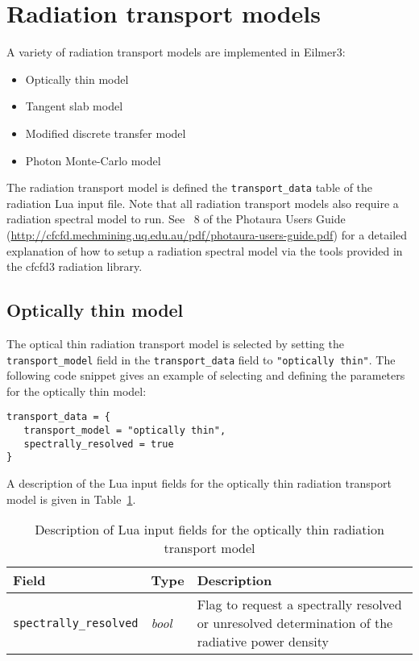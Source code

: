 \section{Radiation transport models}
\label{app:rt-models}

A variety of radiation transport models are implemented in Eilmer3:

\begin{itemize}
 \item Optically thin model
 \item Tangent slab model 
 \item Modified discrete transfer model
 \item Photon Monte-Carlo model
\end{itemize}

The radiation transport model is defined the \texttt{transport\_data} table of the radiation Lua input file.
Note that all radiation transport models also require a radiation spectral model to run.
See \textsection~8 of the Photaura Users Guide (\url{http://cfcfd.mechmining.uq.edu.au/pdf/photaura-users-guide.pdf}) for a detailed explanation of how to setup a radiation spectral model via the tools provided in the cfcfd3 radiation library. 

\subsection{Optically thin model}

The optical thin radiation transport model is selected by setting the \texttt{transport\_model} field in the \texttt{transport\_data} field to \texttt{"optically thin"}.
The following code snippet gives an example of selecting and defining the parameters for the optically thin model:

\noindent \topbar
\begin{lstlisting}[basicstyle=\ttfamily\normalsize]
transport_data = {
   transport_model = "optically thin",
   spectrally_resolved = true
}
\end{lstlisting}
\bottombar

A description of the Lua input fields for the optically thin radiation transport model is given in Table~\ref {tab:OT-input}.

\begin{table}[h]
 \begin{center}
  \caption{Description of Lua input fields for the optically thin radiation transport model}
  \label{tab:OT-input}
\begin{tabular}{llp{8cm}}
 \hline \hline
 Field                                                   & Type                 &  Description \\ \hline
\texttt{spectrally\_resolved}            & \textit{bool}       &  Flag to request a spectrally resolved or unresolved determination of the radiative power density \\
\hline
\end{tabular}
\end{center}
\end{table}

